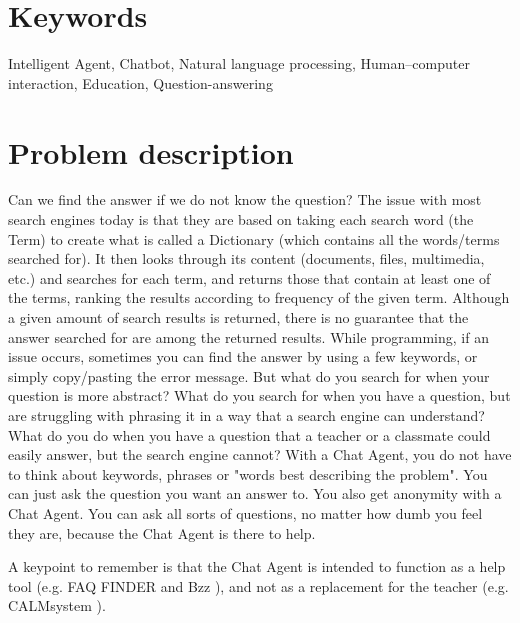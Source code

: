 \section{Keywords}
\label{chapter2:keywords}
Intelligent Agent, Chatbot, Natural language processing, Human–computer interaction, Education, Question-answering

\section{Problem description}
\label{chapter2:problem_description}
Can we find the answer if we do not know the question? The issue with most search engines today is that they are based on taking each search word (the Term) to create what is called 
a Dictionary (which contains all the words/terms searched for). It then looks through its content (documents, files, multimedia, etc.) and searches for each term, and returns those 
that contain at least one of the terms, ranking the results according to frequency of the given term. Although a given amount of search results is returned, there is no guarantee that 
the answer searched for are among the returned results. While programming, if an issue occurs, sometimes you can find the answer by using a few keywords, or simply copy/pasting the 
error message. But what do you search for when your question is more abstract? What do you search for when you have a question, but are struggling with phrasing it in a way that a 
search engine can understand? What do you do when you have a question that a teacher or a classmate could easily answer, but the search engine cannot?
\vspace{0.5em}\newline
With a Chat Agent, you do not have to think about keywords, phrases or "words best describing the problem". You can just ask the question you want an answer to. You also get anonymity 
with a Chat Agent. You can ask all sorts of questions, no matter how dumb you feel they are, because the Chat Agent is there to help. 

A keypoint to remember is that the Chat Agent is intended to function as a help tool (e.g. FAQ FINDER \cite{Burke1997} and Bzz \cite{Crutzen2011}), and not as a replacement for the 
teacher (e.g. CALMsystem \cite{Kerly2008}).

